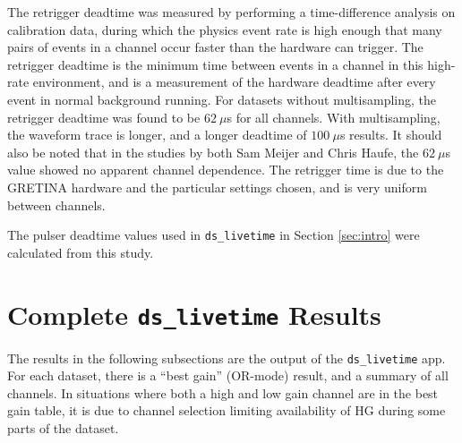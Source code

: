 \documentclass[notitlepage,rmp,aps,10pt]{revtex4-1}
\newcommand{\tty}{\texttt}
\begin{document}
The retrigger deadtime was measured by performing a time-difference analysis on calibration data, during which the physics event rate is high enough that many pairs of events in a channel occur faster than the hardware can trigger.
The retrigger deadtime is the minimum time between events in a channel in this high-rate environment, and is a measurement of the hardware deadtime after every event in normal background running.
For datasets without multisampling, the retrigger deadtime was found to be $62\ \mu$s for all channels.  With multisampling, the waveform trace is longer, and a longer deadtime of $100\ \mu$s results.  It should also be noted that in the studies by both Sam Meijer and Chris Haufe, the $62\ \mu$s value showed no apparent channel dependence.
The retrigger time is due to the GRETINA hardware and the particular settings chosen, and is very uniform between channels.

The pulser deadtime values used in \tty{ds\_livetime} in Section \ref{sec:intro} were calculated from this study.

\newpage
\section{Complete \tty{ds\_livetime} Results} \label{sec:completeResults}
The results in the following subsections are the output of the \texttt{ds\_livetime} app.
For each dataset, there is a ``best gain'' (OR-mode) result, and a summary of all channels.
In situations where both a high and low gain channel are in the best gain table, it is due to channel selection limiting availability of HG during some parts of the dataset.

\small
\end{document}
